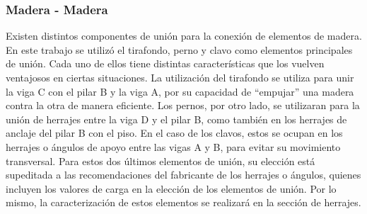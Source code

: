 \subsubsection{Madera - Madera}
Existen distintos componentes de unión para la conexión de elementos de madera. En este trabajo se utilizó el tirafondo, perno y clavo como elementos principales de unión.  Cada uno de ellos tiene distintas características que los vuelven ventajosos en ciertas situaciones. La utilización del tirafondo se utiliza para unir la viga C con el pilar B y la viga A, por su capacidad de ``empujar'' una madera contra la otra de manera eficiente. Los pernos, por otro lado, se utilizaran para la unión de herrajes entre la viga D y el pilar B, como también en los herrajes de anclaje del pilar B con el piso. En el caso de los clavos, estos se ocupan en los  herrajes o ángulos de apoyo entre las vigas A y B, para evitar su movimiento transversal. Para estos dos últimos elementos de unión, su elección está supeditada a las recomendaciones del fabricante de los herrajes o ángulos, quienes incluyen los valores de carga en la elección de los elementos de unión. Por lo mismo, la caracterización de estos elementos se realizará en la sección de herrajes.

